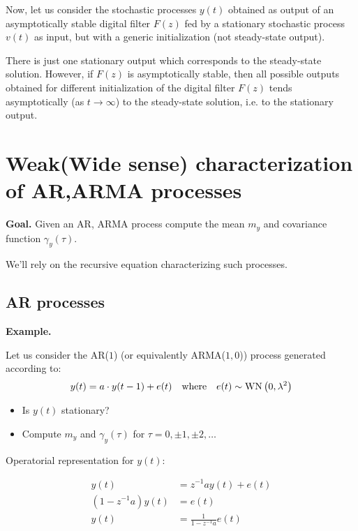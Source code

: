 Now, let us consider the stochastic processes $y(t)$ obtained as output of an asymptotically stable digital filter $F(z)$ fed by a stationary stochastic process $v(t)$ as input, but with a generic initialization (not steady-state output).


\begin{theorem}
	There is just one stationary output which corresponds to the steady-state solution. However, if $F(z)$ is asymptotically stable, then all possible outputs obtained for different initialization of the digital filter $F(z)$ tends asymptotically (as $t \rightarrow \infty$) to the steady-state solution, i.e. to the stationary output.
\end{theorem}


\section{Weak(Wide sense) characterization of AR,ARMA processes}
\textbf{Goal.} Given an AR, ARMA process compute the mean $m_y$ and covariance function $\gamma_y(\tau)$.


We'll rely on the recursive equation characterizing such processes.

\subsection{AR processes}
\textbf{Example.}

Let us consider the AR($1$) (or equivalently ARMA($1,0$)) process generated according to:
\begin{align*}
	y(t)=a \cdot y(t-1)+e(t) \quad \text{where} \quad e(t) \sim \operatorname{WN}\left(0, \lambda^{2}\right)
\end{align*}

\begin{itemize}
	\item Is $y(t)$ stationary?
	\item Compute $m_{y}$ and $\gamma_{y}(\tau)$ for $\tau=0, \pm 1, \pm 2, \ldots$
\end{itemize}

Operatorial representation for $y(t)$:

\begin{align*}
	y(t)&=z^{-1} a y(t)+e(t) \\
	\left(1-z^{-1} a\right) y(t)&=e(t) \\
	y(t)&=\frac{1}{1-z^{-1} a} e(t)
\end{align*}

